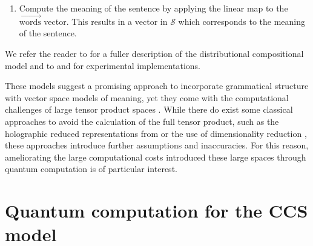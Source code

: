 \begin{enumerate}
\begin{equation}
\begin{aligned}
\begin{tikzpicture}[scale=0.5, yscale=-1]
                \draw (8.center) to (6.center);
                \draw (6.center) to (7.center);
                \draw (4.center) to (5.center);
                \draw (3.center) to (5.center);
                \draw (8.center) to (7.center);
                \draw (9.center) to (14.center);
                \draw (10.center) to (15.center);
                \draw (11.center) to (16.center);
                \draw (12.center) to (17.center);
                \draw (13.center) to (18.center);
                \draw [thick, bend right=90, looseness=1.25] (24.center) to (25.center);
                \draw [thick, bend right=90, looseness=1.25] (27.center) to (28.center);
                \draw (26.center) to (29.center);
\end{tikzpicture}
\end{aligned}
\end{equation}

\item Compute the meaning of the sentence by applying the linear map to the $\overrightarrow{\mbox{words}}$ vector. This results in a vector in $\mathcal{S}$ which corresponds to the meaning of the sentence.
\end{enumerate}

\noindent We refer the reader to \cite{coecke2010mathematical} for a fuller description of the distributional compositional model and to \cite{experimental-catcompdist} and \cite{kartsaklis2012unified} for experimental implementations.

These models suggest a promising approach to incorporate grammatical structure with vector space models of meaning, yet they come with the computational challenges of large tensor product spaces \cite{GrefenstetteThesis2013}. While there do exist some classical approaches to avoid the calculation of the full tensor product, such as the holographic reduced representations from \cite{plate1991holographic} or the use of dimensionality reduction \cite{polajnar2013learning}, these approaches introduce further assumptions and inaccuracies.  For this reason, ameliorating the large computational costs introduced these large spaces through quantum computation is of particular interest.

\section{Quantum computation for the CCS model}

